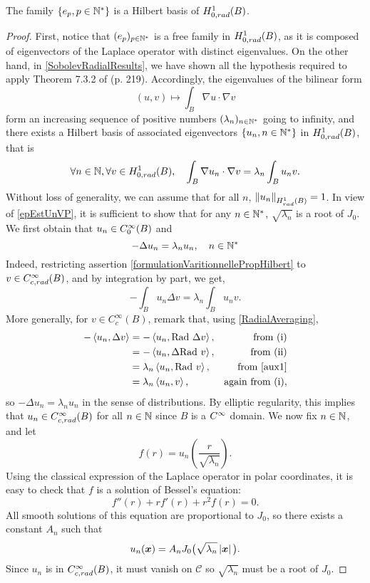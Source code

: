 \documentclass[11pt,a4paper]{article}
\begin{document}
\begin{The} 
	\label{epEstUneBaseDeHilbert}
	The family $\left\{e_p, p\in \mathbb{N}^*\right\}$ is a Hilbert basis of $H^1_{0,rad}(B)$.
\end{The}
\begin{proof}
	First, notice that $(e_p)_{p \in \mathbb{N}^*}$ is a free family in $H^1_{0,rad}(B)$, as it is composed of eigenvectors of the Laplace operator with distinct eigenvalues. On the other hand, in \autoref{SobolevRadialResults}, we have shown all the hypothesis required to apply Theorem 7.3.2 of \cite{allaire2005analyse} (p. 219). Accordingly, the eigenvalues of the bilinear form  
	\[(u,v)\mapsto \int_{B} \nabla u \cdot \nabla v\]
	form an increasing sequence of positive numbers $(\lambda_n)_{n \in \mathbb{N}^*}$ going to infinity, and there exists a Hilbert basis of associated eigenvectors $\left\{u_n, n\in \mathbb{N}^*\right\}$ in $H^1_{0,rad}(B)$, that is 							
	\begin{equation}
		\label{formulationVaritionnellePropHilbert}
		\forall n \in \mathbb{N}, \forall v \in H^1_{0,rad}(B), \quad \int_{B}\nabla u_n \cdot \nabla v = \lambda_n \int_B u_n v.
	\end{equation}
	Without loss of generality, we can assume that for all $n$, $\left\|u_n\right\|_{H^1_{rad}(B)} = 1$. In view of \eqref{epEstUnVP}, it is sufficient to show that for any $n \in \mathbb{N}^*$, $\sqrt{\lambda_n}$ is a root of $J_0$. We first obtain that $u_n \in C^{\infty}_0(B)$ and 
	\[ - \Delta u_n = \lambda_n u_n, \quad n \in \mathbb{N}^*\]
	Indeed, restricting assertion \eqref{formulationVaritionnellePropHilbert} to $v \in C^\infty_{c,rad}(B)$, and by integration by part, we get, 
	\begin{equation}
		\label{aux1}
		{\mathop-}\int_{B} u_n \Delta v = \lambda_n \int_{B} u_n v.
	\end{equation}
	More generally, for $v \in C^{\infty}_c(B)$, remark that, using \autoref{RadialAveraging},
	\begin{align*}
		-\left\langle u_n,\Delta v\right\rangle & = -\left\langle u_n,\textup{Rad }\Delta v\right\rangle,  & \text{from (i)}          \\
		                         & =-\left\langle u_n,\Delta \textup{Rad }v\right\rangle,   & \text{from (ii)}         \\
		                         & =\lambda_n \left\langle u_n,\textup{Rad }v\right\rangle, & \text{from \eqref{aux1}} \\
		                         & =\lambda_n \left\langle u_n,v\right\rangle,              & \text{again from (i)},   
	\end{align*}	
	so $-\Delta u_n = \lambda_n u_n$ in the sense of distributions. By elliptic regularity, this implies that $u_n \in C^\infty_{c,rad}(B)$ for all $n \in \mathbb{N}$ since $B$ is a $C^{\infty}$ domain. We now fix $n \in \mathbb{N}$, and let 
	\[f(r) = u_n\left( \frac{r}{\sqrt{\lambda_n}}\right).\]
	Using the classical expression of the Laplace operator in polar coordinates, it is easy to check that $f$ is a solution of Bessel's equation:	
	\[ f''(r) + r f'(r) + r^2 f(r) = 0.\]
	All smooth solutions of this equation are proportional to $J_0$, so there exists a constant $A_n$ such that
	\[u_n(\boldsymbol{x}) = A_n J_0\big(\sqrt{\lambda_n} \left\lvert \boldsymbol{x} \right\rvert\big).\]
	Since $u_n$ is in $C^\infty_{c,rad}(B)$, it must vanish on $\mathcal{C}$ so $\sqrt{\lambda_n}$ must be a root of $J_0$. \qedhere
\end{proof}
\end{document}

